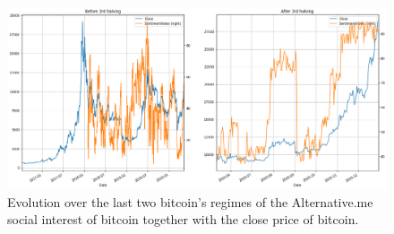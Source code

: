 \begin{figure}[H]
    \centering
    \includegraphics[width=\textwidth]{methods/images/alternative_me_halvings.png}
    \caption{Evolution over the last two bitcoin's regimes of the Alternative.me social interest of bitcoin together with the close price of bitcoin.}
    \label{fig:alternative_me}
\end{figure} 